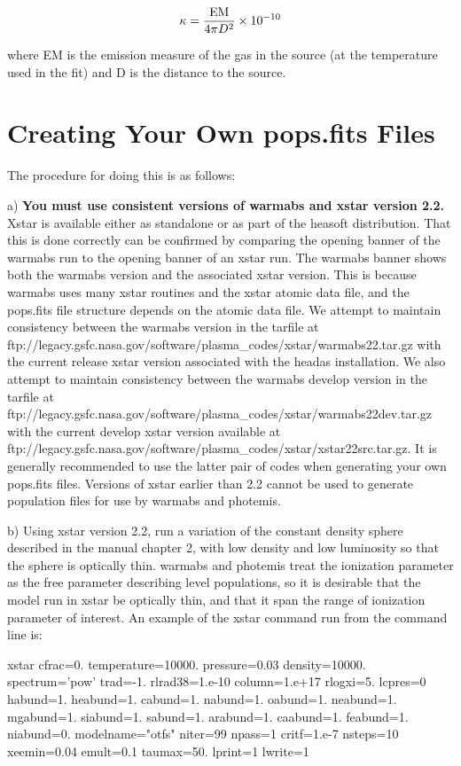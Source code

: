 \begin{equation}
\kappa=\frac{{\rm EM}}{4\pi D^2} \times 10^{-10}
\end{equation}

\noindent where EM is the emission measure of the gas 
in the source (at the temperature used in the fit) and D is the distance to 
the source.  


\section{Creating Your Own pops.fits Files}

The procedure for doing this is as follows:

a) {\bf You must use consistent versions of warmabs and xstar version 2.2.}
Xstar is available either as standalone or as 
part of the heasoft distribution.  That this is done correctly can be confirmed by comparing the 
opening banner of the warmabs run to the opening banner of an xstar run.  The warmabs banner shows 
both the warmabs version and the associated xstar version.  This is because 
warmabs uses many xstar routines and the xstar atomic data file, and the pops.fits file
structure depends on the atomic data file.   We attempt to maintain 
consistency between the warmabs version in the tarfile at 
ftp://legacy.gsfc.nasa.gov/software/plasma\_codes/xstar/warmabs22.tar.gz
with the current release xstar version associated with the headas installation.  
We also attempt to maintain 
consistency between the warmabs develop version in the tarfile at 
ftp://legacy.gsfc.nasa.gov/software/plasma\_codes/xstar/warmabs22dev.tar.gz
with the current develop xstar version available at
ftp://legacy.gsfc.nasa.gov/software/plasma\_codes/xstar/xstar22src.tar.gz.
It is generally recommended to use the latter pair of codes when generating your own pops.fits files.
Versions of xstar earlier than 2.2 cannot be used to generate population files 
for use by warmabs and photemis.

b) Using xstar version 2.2, run a variation of the constant density sphere
described in the manual chapter 2, with low density and low luminosity so that the sphere 
is optically thin. warmabs and photemis treat the ionization parameter as the free parameter
describing level populations, so it is desirable that the model run in xstar
be optically thin, and that it span the range of ionization parameter of interest.
An example of the xstar command run from the command line is:

xstar cfrac=0. temperature=10000. pressure=0.03 density=10000. spectrum='pow'  trad=-1. rlrad38=1.e-10  column=1.e+17   rlogxi=5.  lcpres=0 habund=1. heabund=1.  cabund=1. nabund=1. oabund=1. neabund=1. mgabund=1. siabund=1.  sabund=1.  arabund=1. caabund=1. feabund=1. niabund=0. modelname="otfs" niter=99  npass=1 critf=1.e-7 nsteps=10 xeemin=0.04 emult=0.1 taumax=50. lprint=1 lwrite=1

